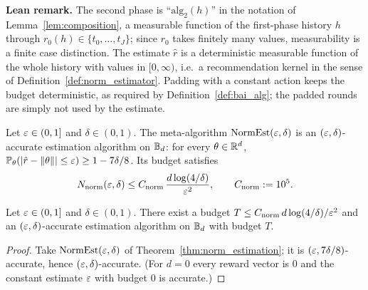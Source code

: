 \textbf{Lean remark.} The second phase is ``$\mathrm{alg}_2(h)$'' in the notation of
Lemma~\ref{lem:composition}, a measurable function of the first-phase history $h$ through
$r_0(h) \in \{t_0,\dots,t_J\}$; since $r_0$ takes finitely many values, measurability is a
finite case distinction. The estimate $\hat r$ is a deterministic measurable function of the
whole history with values in $[0,\infty)$, i.e.\ a recommendation kernel in the sense of
Definition~\ref{def:norm_estimator}. Padding with a constant action keeps the budget
deterministic, as required by Definition~\ref{def:bai_alg}; the padded rounds are simply
not used by the estimate.

\begin{theorem}\label{thm:norm_estimation}
\leanok
{}
Let $\varepsilon \in (0,1]$ and $\delta \in (0,1)$. The meta-algorithm $\mathrm{NormEst}(\varepsilon,\delta)$
is an $(\varepsilon,\delta)$-accurate estimation algorithm on $\mathbb{B}_d$: for every
$\theta \in \mathbb{R}^d$, $\mathbb{P}_\theta(|\hat r - \lVert \theta \rVert| \le \varepsilon) \ge 1 - 7\delta/8$. Its
budget satisfies
\[
  N_{\mathrm{norm}}(\varepsilon,\delta) \le C_{\mathrm{norm}}\,\frac{d\log(4/\delta)}{\varepsilon^2},
  \qquad C_{\mathrm{norm}} := 10^5 .
\]
\end{theorem}

\begin{corollary}\label{cor:norm_estimation_exists}
\leanok
{}
Let $\varepsilon \in (0,1]$ and $\delta \in (0,1)$. There exist a budget
$T \le C_{\mathrm{norm}}\, d\log(4/\delta)/\varepsilon^2$ and an $(\varepsilon,\delta)$-accurate estimation
algorithm on $\mathbb{B}_d$ with budget $T$.
\end{corollary}
\begin{proof}
\leanok
{}
Take $\mathrm{NormEst}(\varepsilon,\delta)$ of Theorem~\ref{thm:norm_estimation}; it is
$(\varepsilon, 7\delta/8)$-accurate, hence $(\varepsilon,\delta)$-accurate. (For $d = 0$ every reward
vector is $0$ and the constant estimate $\varepsilon$ with budget $0$ is accurate.)
\end{proof}

